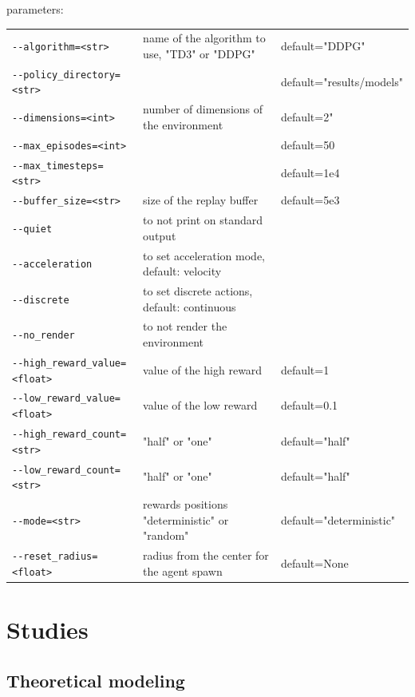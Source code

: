 \documentclass{article}
\begin{document}
parameters:

\def\arraystretch{1.5}
\begin{center}
\begin{longtable}{l l l}
    \lstinline|--algorithm=<str>| & name of the algorithm to use, "TD3" or "DDPG" & default="DDPG"\\
    \lstinline|--policy_directory=<str>| & & default="results/models"\\
    \lstinline|--dimensions=<int>| & number of dimensions of the environment & default=2"\\
    \lstinline|--max_episodes=<int>| & & default=50\\
    \lstinline|--max_timesteps=<str>| & & default=1e4\\
    \lstinline|--buffer_size=<str>| & size of the replay buffer & default=5e3\\
    \lstinline|--quiet| & to not print on standard output &\\
    \lstinline|--acceleration| & to set acceleration mode, default: velocity\\
    \lstinline|--discrete| & to set discrete actions, default: continuous\\
    \lstinline|--no_render| & to not render the environment\\
    \lstinline|--high_reward_value=<float>| & value of the high reward & default=1\\
    \lstinline|--low_reward_value=<float>| & value of the low reward & default=0.1\\
    \lstinline|--high_reward_count=<str>| & "half" or "one" & default="half"\\
    \lstinline|--low_reward_count=<str>| & "half" or "one" & default="half"\\
    \lstinline|--mode=<str>| & rewards positions "deterministic" or "random" & default="deterministic"\\
    \lstinline|--reset_radius=<float>| & radius from the center for the agent spawn & default=None\\
\end{longtable}
\end{center}

\section{Studies}

\subsection{Theoretical modeling}
\end{document}
